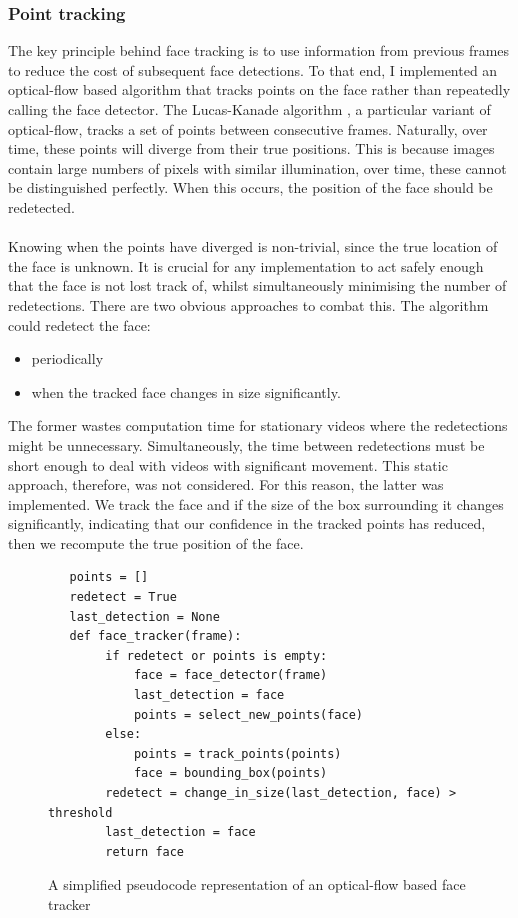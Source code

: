 \subsubsection{Point tracking}
The key principle behind face tracking is to use information from previous frames to reduce the cost of subsequent face detections.
To that end, I implemented an optical-flow based algorithm that tracks points on the face rather than repeatedly calling the face detector. The Lucas-Kanade algorithm \cite{LucasKanade}, a particular variant of optical-flow, tracks a set of points between consecutive frames. Naturally, over time, these points will diverge from their true positions. This is because images contain large numbers of pixels with similar illumination, over time, these cannot be distinguished perfectly. When this occurs, the position of the face should be redetected. 
\\ \\
Knowing when the points have diverged is non-trivial, since the true location of the face is unknown. It is crucial for any implementation to act safely enough that the face is not lost track of, whilst simultaneously minimising the number of redetections.
There are two obvious approaches to combat this. The algorithm could redetect the face: 
\begin{itemize}
    \item periodically 
    \item when the tracked face changes in size significantly. 
\end{itemize}
The former wastes computation time for stationary videos where the redetections might be unnecessary. Simultaneously, the time between redetections must be short enough to deal with videos with significant movement. This static approach, therefore, was not considered. For this reason, the latter was implemented. We track the face and if the size of the box surrounding it changes significantly, indicating that our confidence in the tracked points has reduced, then we recompute the true position of the face.
\begin{figure}[H]
\centering
\begin{verbatim}
   points = []
   redetect = True
   last_detection = None
   def face_tracker(frame):
        if redetect or points is empty:
            face = face_detector(frame) 
            last_detection = face
            points = select_new_points(face)
        else:
            points = track_points(points)
            face = bounding_box(points)
        redetect = change_in_size(last_detection, face) > threshold
        last_detection = face
        return face
\end{verbatim}
\caption{A simplified pseudocode representation of an optical-flow based face tracker}
\end{figure} 
